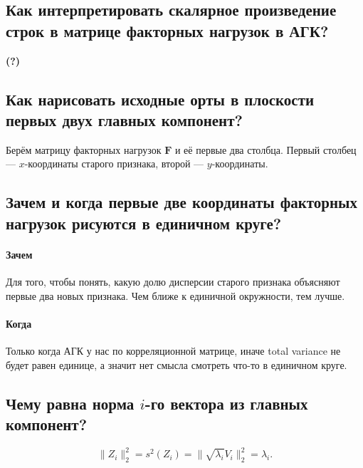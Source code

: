 \documentclass[12pt,a4paper,final]{article}
\begin{document}
\subsection{Как интерпретировать скалярное произведение строк в матрице факторных нагрузок в АГК?}
\textbf{(?)} 


\subsection{Как нарисовать исходные орты в плоскости первых двух главных компонент?}

Берём матрицу факторных нагрузок $\bm F$ и её первые два столбца. Первый столбец --- $x$-координаты старого признака, второй --- $y$-координаты.

\subsection{Зачем и когда первые две координаты факторных нагрузок рисуются в единичном круге?}

\paragraph{Зачем}
Для того, чтобы понять, какую долю дисперсии старого признака объясняют первые два новых признака. Чем ближе к единичной окружности, тем лучше.

\paragraph{Когда}
Только когда АГК у нас по корреляционной матрице, иначе total variance не будет равен единице, а значит нет смысла смотреть что-то в единичном круге.

\subsection{Чему равна норма $i$-го вектора из главных компонент?}

$$
\|Z_i\|^2_2 =s^2(Z_i) = \|\sqrt{\lambda_i} V_i\|^2_2 = \lambda_i .
$$
\end{document}
